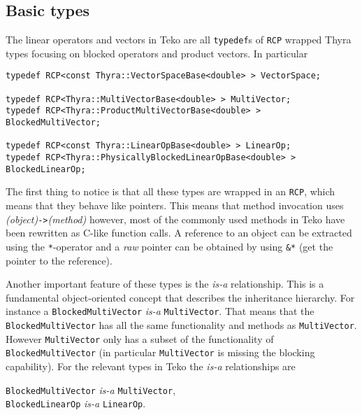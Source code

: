 \documentclass[12pt]{article}
\newcommand{\code}[1]{\lstinline[basicstyle=\footnotesize]!#1!}
\begin{document}
\subsection{Basic types}
The linear operators and vectors in Teko are all \code{typedef}s of 
\code{RCP} wrapped Thyra types focusing on blocked operators and product
vectors. In particular
\begin{framed}
\begin{lstlisting}
typedef RCP<const Thyra::VectorSpaceBase<double> > VectorSpace;

typedef RCP<Thyra::MultiVectorBase<double> > MultiVector;
typedef RCP<Thyra::ProductMultiVectorBase<double> > BlockedMultiVector;

typedef RCP<const Thyra::LinearOpBase<double> > LinearOp;
typedef RCP<Thyra::PhysicallyBlockedLinearOpBase<double> > BlockedLinearOp;
\end{lstlisting}
\end{framed}

The first thing to notice is that all these types are wrapped in an \code{RCP},
which means that they behave like pointers. This means that method invocation
uses \emph{(object)}\code{->}\emph{(method)} however, most of the commonly used
methods in Teko have been rewritten as C-like function calls.  A reference to an
object can be extracted using the \code{*}-operator and a \emph{raw} pointer can
be obtained by using \code{&*} (get the pointer to the reference).

Another important feature of these types is the \emph{is-a} relationship. This
is a fundamental object-oriented concept that describes the inheritance hierarchy.
For instance a \code{BlockedMultiVector} \emph{is-a} \code{MultiVector}. That means
that the \code{BlockedMultiVector} has all the same functionality and methods as
\code{MultiVector}. However \code{MultiVector} only has a subset of the functionality
of \code{BlockedMultiVector} (in particular \code{MultiVector} is missing the blocking
capability). For the relevant types in Teko the \emph{is-a} relationships are
\begin{center}
\code{BlockedMultiVector} \emph{is-a} \code{MultiVector}, \\
\code{BlockedLinearOp} \emph{is-a} \code{LinearOp}.
\end{center}
\end{document}

